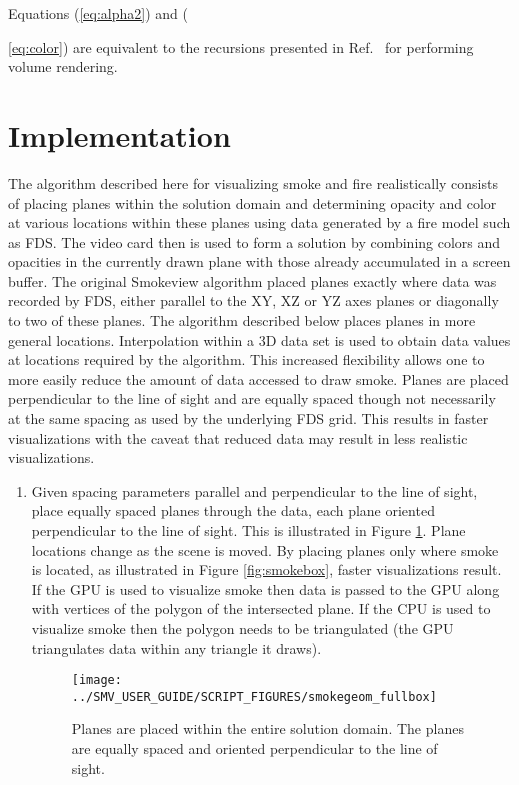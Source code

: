 Equations (\ref{eq:alpha2}) and ({\ref{eq:color}) are equivalent
to the recursions presented in Ref.~\cite[Chapter 39]{gpugems} for
performing volume rendering.


\section{Implementation}
The algorithm described here for visualizing smoke and fire realistically consists of placing
planes within the solution domain and determining opacity and color
at various locations within these planes
using data generated by a fire model such as FDS.  The video card then is
used to form a solution by combining colors and opacities in the currently drawn
plane with those already accumulated in a screen buffer.
The original Smokeview algorithm placed planes exactly where data was recorded by FDS, either parallel to the XY, XZ or YZ axes planes or diagonally to two of these planes.
The algorithm described below places planes in more general locations. Interpolation within a 3D data set is used to obtain data values at locations required by the algorithm.
This increased flexibility
allows one to more easily reduce the amount of data accessed to draw smoke.
Planes are placed perpendicular to the line of sight and are equally spaced though not necessarily at the same spacing as used by the underlying FDS grid.
This results in faster visualizations with the caveat that reduced data may result in less realistic visualizations.

\begin{enumerate}
\item Given spacing parameters parallel and perpendicular to the line of sight, place
equally spaced planes
through the data, each plane oriented perpendicular to the line of sight.
This is illustrated in Figure \ref{fig:smokeplanes}. Plane locations change as
the scene is moved.  By placing planes only where smoke is located, as illustrated in Figure \ref{fig:smokebox}, faster visualizations result.
If the GPU is used to visualize smoke then data is passed to the GPU along with
vertices of the polygon of the intersected plane.  If the CPU is used to visualize smoke then
the polygon needs to be triangulated (the GPU triangulates data within any triangle it draws).


\begin{figure}[bph]
\begin{center}
\texttt{[image: ../SMV\_USER\_GUIDE/SCRIPT\_FIGURES/smokegeom\_fullbox]}
\end{center}
\caption{Planes are placed within the entire solution domain.  The planes are equally spaced and oriented perpendicular to the line of sight.}
\label{fig:smokeplanes}
\end{figure}



\end{enumerate}}
